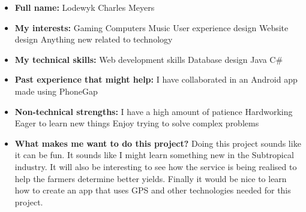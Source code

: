 \documentclass{article}
\begin{document}
	\begin{itemize}
		\item \textbf{Full name:} Lodewyk Charles Meyers
		\item \textbf{My interests:}
			\subitem Gaming
			\subitem Computers
			\subitem Music
			\subitem User experience design
			\subitem Website design
			\subitem Anything new related to technology
		\item \textbf{My technical skills:}
			\subitem Web development skills
			\subitem Database design
			\subitem Java
			\subitem C\#
		\item \textbf{Past experience that might help:}
			\subitem I have collaborated in an Android app made using PhoneGap
		\item \textbf{Non-technical strengths:}
			\subitem I have a high amount of patience
			\subitem Hardworking
			\subitem Eager to learn new things
			\subitem Enjoy trying to solve complex problems
		\item \textbf{What makes me want to do this project?} \newline
		Doing  this project sounds like it can be fun. It sounds like I might learn something new in the Subtropical industry. It will also be interesting to see how the service is being realised to help the farmers determine better yields. Finally it would be nice to learn how to create an app that uses GPS and other technologies needed for this project.
	\end{itemize}
	
\end{document}
